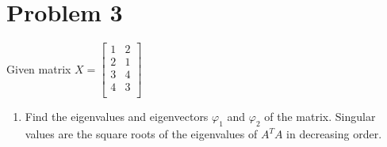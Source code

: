 \documentclass{article}
\begin{document}
\section*{Problem 3}
Given matrix
$X
=
\begin{bmatrix}
1 & 2 \\
2 & 1 \\
3 & 4 \\
4 & 3 \\
\end{bmatrix}
$
\begin{enumerate}[1)]
\item Find the eigenvalues and eigenvectors $\varphi_1$ and $\varphi_2$ of the matrix.
\newline
Singular values are the square roots of the eigenvalues of $A^TA$ in decreasing order.


\end{enumerate}
\end{document}
